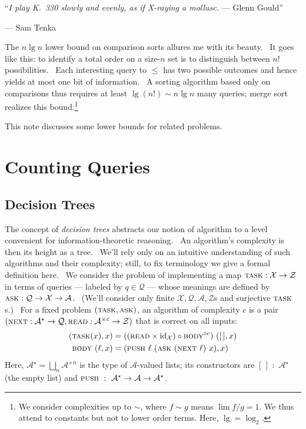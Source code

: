 \documentclass[11pt, justified]{tufte-book}
\newcommand{\Aa}{\mathcal{A}}
\newcommand{\Qq}{\mathcal{Q}}
\newcommand{\Xx}{\mathcal{X}}
\newcommand{\Zz}{\mathcal{Z}}
\newcommand{\Task}{\textsc{task}}
\newcommand{\Ask}{\textsc{ask}}
\newcommand{\Next}{\textsc{next}}
\newcommand{\Read}{\textsc{read}}
\newcommand{\Body}{\textsc{body}}
\newcommand{\Push}{\textsc{push}}
\theoremstyle{definition}
\newcommand{\mtit}[1]{\noindent{\Huge\color{mblu}\bf\textsf{#1}}\vspace{1.5cm}}
\newcommand{\msec}[1]{{\let\clearpage\relax\chapter{\color{mblu}\textsf{#1}}}}
\newcommand{\msub}[1]{\vspace{0.3cm}\section{\color{mblu}\textsf{#1}}}
\begin{document}
    \mtit{Entropic Lower Bounds for Sorting}

        \begin{flushright}
            \par``\emph{I play K.\ 330 slowly and evenly, as if X-raying a mollusc.} --- Glenn Gould''
            \par--- Sam Tenka
        \end{flushright}


        The $n \lg n$ lower bound on comparison sorts allures me with its
        beauty.  It goes like this: to identify a total order on a size-$n$ set
        is to distinguish between $n!$ possibilities.  Each interesting query
        to $\leq$ has two possible outcomes and hence yields at most one bit of
        information.  A sorting algorithm based only on comparisons thus
        requires at least $\lg(n!) \sim n \lg n$ many queries; merge sort
        realizes this bound.\footnote{
            We consider complexities up to $\sim$, where $f\sim g$ means $\lim
            f/g = 1$.  We thus attend to constants but not to lower order
            terms.  Here, $\lg=\log_2$.
        }

        This note discusses some lower bounds for related problems.


    \msec{Counting Queries}
      \msub{Decision Trees}
        The concept of \emph{decision trees} abstracts our notion of algorithm
        to a level convenient for information-theoretic reasoning.  An
        algorithm's complexity is then its height as a tree.  We'll rely only
        on an intuitive understanding of such algorithms and their complexity;
        still, to fix terminology we give a formal definition here.  We
        consider the problem of implementing a map $\Task:\Xx\to\Zz$ in terms
        of queries --- labeled by $q\in\Qq$ --- whose meanings are defined by
        $\Ask:\Qq\to\Xx\to\Aa$.  (We'll consider only finite $\Xx,\Qq,\Aa,\Zz$s
        and surjective $\Task$s.)  For a fixed problem $(\Task, \Ask)$, an
        algorithm of complexity $c$ is a pair $(\Next:\Aa^\star\to \Qq,
        \Read:\Aa^{\times c} \to \Zz)$ that is correct on all inputs:
        \begin{align*}
          (\Task(x), x) &= ((\Read \times {\rm id}_{\Xx}) \circ \Body^{\circ c}) \,\, ([\,], x) \\
          \Body \,\, (\ell, x) &= (\Push \,\, \ell \,\, (\Ask \,\, (\Next \,\, \ell) \,\, x), x)
        \end{align*}
        Here, $\Aa^\star = \bigsqcup_n \Aa^{\times n}$ is the type of
        $\Aa$-valued lists; its constructors are $[\,] \,\, : \,\, \Aa^\star$ (the
        empty list) and $\Push \,\, : \,\, \Aa^\star \to \Aa \to \Aa^\star$.
\end{document}
